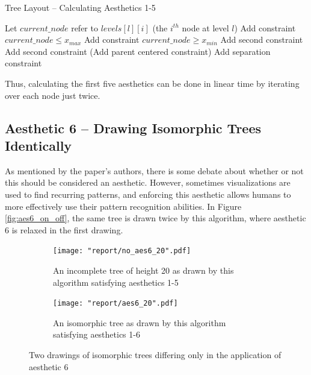 \documentclass[11pt]{report}
\begin{document}
\begin{algorithm}[H]
    \caption{Tree Layout -- Calculating Aesthetics 1-5}
    \begin{algorithmic}[1]
             
            \State Let $current\_node$ refer to $levels[l][i]$ (the $i^{th}$ node at level $l$)
            \State Add constraint $current\_node \leq x_{max}$ 
            \State Add constraint $current\_node \geq x_{min}$
                \State Add second constraint
            \EndIf
                \State Add second constraint
            \EndIf
                \State (Add parent centered constraint)
            \EndIf
                \State Add separation constraint
            \EndIf
            \EndFor
        \EndFor
        \EndProcedure
    \end{algorithmic}
\end{algorithm}

Thus, calculating the first five aesthetics can be done in linear time by iterating over each node just twice.

\subsection{Aesthetic 6 -- Drawing Isomorphic Trees Identically}
As mentioned by the paper's authors, there is some debate about whether or not this should be considered an aesthetic. However, sometimes visualizations are used to find recurring patterns, and enforcing this aesthetic allows humans to more effectively use their pattern recognition abilities. In Figure \ref{fig:aes6_on_off}, the same tree is drawn twice by this algorithm, where aesthetic 6 is relaxed in the first drawing.

\begin{figure}[H]
    \label{fig:aes6_on_off}
    \begin{subfigure}{\linewidth}
        \centering
        \texttt{[image: "report/no\_aes6\_20".pdf]}
        \caption{An incomplete tree of height 20 as drawn by this algorithm satisfying aesthetics 1-5}
    \end{subfigure}
    
    \begin{subfigure}{\linewidth}
    \centering
    \texttt{[image: "report/aes6\_20".pdf]}
    \caption{An isomorphic tree as drawn by this algorithm satisfying aesthetics 1-6}
    \end{subfigure}
    \caption{Two drawings of isomorphic trees differing only in the application of aesthetic 6}
\end{figure}
\end{document}
